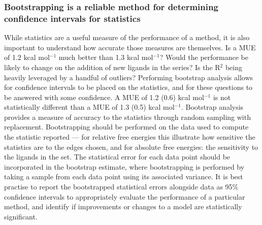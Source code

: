 \documentclass[9pt,bestpractices]{livecoms}
\begin{document}
\subsubsection{Bootstrapping is a reliable method for determining confidence intervals for statistics}

While statistics are a useful measure of the performance of a method, it is also important to understand how accurate those measures are themselves. Is a MUE of 1.2 kcal mol$^{-1}$ much better than 1.3 kcal mol$^{-1}$? Would the performance be likely to change on the addition of new ligands in the series? Is the R$^2$ being heavily leveraged by a handful of outliers? Performing bootstrap analysis allows for confidence intervals to be placed on the statistics, and for these questions to be answered with some confidence. A MUE of 1.2 (0.6) kcal mol$^{-1}$ is not statistically different than a MUE of 1.3 (0.5) kcal mol$^{-1}$. Bootstrap analysis provides a measure of accuracy to the statistics through random sampling with replacement. Bootstrapping should be performed on the data used to compute the statistic reported --- for relative free energies this illustrate how sensitive the statistics are to the edges chosen, and for absolute free energies: the sensitivity to the ligands in the set. The statistical error for each data point should be incorporated in the bootstrap estimate, where bootstrapping is performed by taking a sample from each data point using its associated variance. It is best practise to report the bootstrapped statistical errors alongside data as 95\% confidence intervals to appropriately evaluate the performance of a particular method, and identify if improvements or changes to a model are statistically significant.


\end{document}
